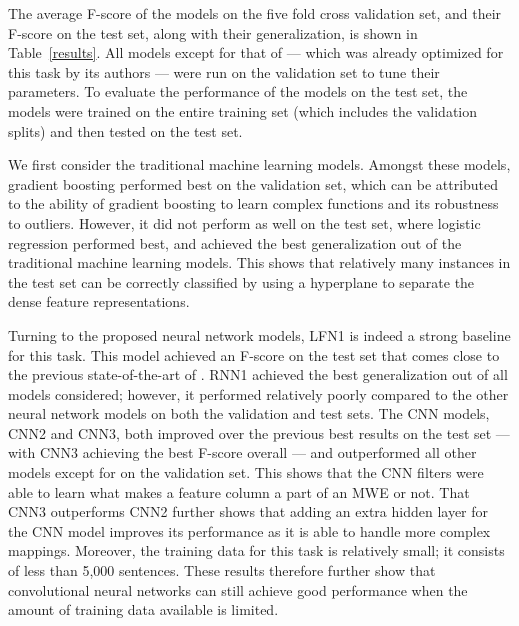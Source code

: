 \documentclass[11pt,a4paper]{article}
\newcommand{\tabref}[1]{Table~\ref{#1}}
\begin{document}
The average F-score of the models on the five fold cross validation
set, and their F-score on the test set, along with their
generalization, is shown in \tabref{results}. 
All models except for that of 
--- which was already optimized for this task by its authors --- were
run on the validation set to tune their parameters. To evaluate the
performance of the models on the test set, the models were trained on
the entire training set (which includes the validation splits) and
then tested on the test set.


We first consider the traditional machine learning models. Amongst
these models, gradient boosting performed best on the validation set,
which can be attributed to the ability of gradient boosting to learn
complex functions and its robustness to outliers. However, it did not
perform as well on the test set, where logistic regression performed
best, and achieved the best generalization out of the traditional
machine learning models. This shows that relatively many instances in
the test set can be correctly classified by using a hyperplane to
separate the dense feature representations.

Turning to the proposed neural network models, LFN1 is indeed a
strong baseline for this task. This model achieved an F-score on the
test set that comes close to the previous state-of-the-art of . RNN1 achieved the best
generalization out of all models considered; however, it performed
relatively poorly compared to the other neural network models on both
the validation and test sets. The CNN models, CNN2 and CNN3, both
improved over the previous best results on the test set --- with CNN3
achieving the best F-score overall --- and outperformed all other
models except for \cite{schneider2014discriminative} on the validation
set.  This shows that the CNN filters were able to learn what makes a
feature column a part of an MWE or not. That CNN3 outperforms CNN2
further shows that adding an extra hidden layer for the CNN model
improves its performance as it is able to handle more complex
mappings. Moreover, the training data for this task is relatively
small; it consists of less than 5,000 sentences. These results
therefore further show that convolutional neural networks can still
achieve good performance when the amount of training data available is
limited.
\end{document}
